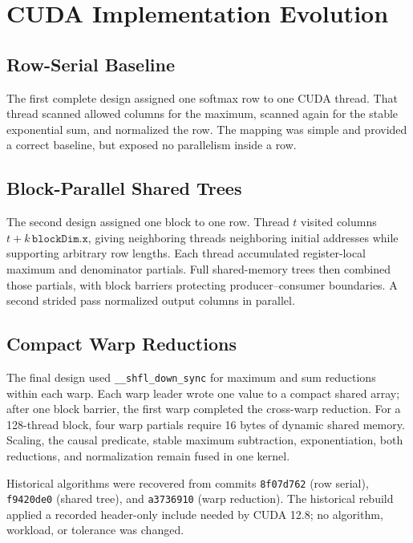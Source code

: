 \documentclass[twoside,twocolumn,10pt]{article}
\newcommand{\code}[1]{\texttt{#1}}
\newcounter{algorithm}
\begin{document}
\section{CUDA Implementation Evolution}

\subsection{Row-Serial Baseline}

The first complete design assigned one softmax row to one CUDA thread. That
thread scanned allowed columns for the maximum, scanned again for the stable
exponential sum, and normalized the row. The mapping was simple and provided a
correct baseline, but exposed no parallelism inside a row.

\subsection{Block-Parallel Shared Trees}

The second design assigned one block to one row. Thread $t$ visited columns
$t+k\,\code{blockDim.x}$, giving neighboring threads neighboring initial
addresses while supporting arbitrary row lengths. Each thread accumulated
register-local maximum and denominator partials. Full shared-memory trees then
combined those partials, with block barriers protecting producer--consumer
boundaries. A second strided pass normalized output columns in parallel.

\subsection{Compact Warp Reductions}

The final design used \code{\_\_shfl\_down\_sync} for maximum and sum
reductions within each warp. Each warp leader wrote one value to a compact
shared array; after one block barrier, the first warp completed the cross-warp
reduction. For a 128-thread block, four warp partials require 16 bytes of
dynamic shared memory. Scaling, the causal predicate, stable maximum
subtraction, exponentiation, both reductions, and normalization remain fused in
one kernel.

Historical algorithms were recovered from commits \code{8f07d762} (row
serial), \code{f9420de0} (shared tree), and \code{a3736910} (warp reduction).
The historical rebuild applied a recorded header-only include needed by CUDA
12.8; no algorithm, workload, or tolerance was changed.
\end{document}
